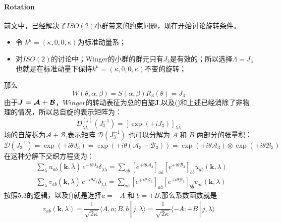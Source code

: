 \paragraph*{Rotation}
前文中，已经解决了$ISO(2)$小群带来的约束问题，现在开始讨论旋转条件。
\begin{itemize}
    \item 令 $k^\mu = (\kappa,0,0,\kappa)$为标准动量系；
    \item 对$ISO(2) $的讨论中；Winger的小群的群元只有$J_3$是有效的；所以选择$\Lambda=J_3$也就是在标准动量下保持$k^\mu = (\kappa,0,0,\kappa)$不变的旋转；
\end{itemize}
那么
\[W(\theta,\alpha,\beta)=S(\alpha,\beta)R_3(\theta)=J_3\]
由于$\boldmath{J}=\boldsymbol{\mathcal{A}}+\boldsymbol{\mathcal{B}}$，$Winger$的转动表征为总的自旋$\boldsymbol{J}$,以及()和上述已经消除了非物理的情况，所以总自旋的表示矩阵为：
\[
D_{\lambda\bar\lambda}^{(j)}(J_3^{-1})=\left[\exp(+iJ_3)\right]_{\lambda\bar\lambda}
\]
场的自旋拆为$\boldsymbol{\mathcal{A}}+\boldsymbol{\mathcal{B}}$,表示矩阵 $\mathscr{D}(J_3^{-1})$ 也可以分解为 $A$ 和 $B$ 两部分的张量积：
\[
\mathscr{D}(J_3^{-1}) = \exp\left( +i \theta J_3 \right) = \exp\left( +i \theta (\mathcal{A}_3 + \mathcal{B}_3) \right) = \exp\left( +i \theta \mathcal{A}_3 \right) \otimes \exp\left( +i \theta \mathcal{B}_3 \right)
\]
在这种分解下交织方程变为：  
\begin{subequations}\label{massless_rotation}
    \begin{align}
        &\sum_{\bar\lambda} u_{ab}(\boldsymbol{k},\bar\lambda)\, e^{-i \theta J_3} \delta_{\lambda\bar\lambda} = \sum_{\bar{a}\bar{b}} \left[ e^{+i \theta \mathcal{A}_3} \right]_{a\bar{a}} \left[ e^{+i \theta \mathcal{B}_3} \right]_{b\bar{b}} u_{\bar{a}\bar{b}}(\boldsymbol{k},\lambda)\\
        &\sum_{\bar\lambda} v_{ab}(\boldsymbol{k},\bar\lambda)\,e^{+i \theta J_3} \delta_{\lambda\bar\lambda} = \sum_{\bar{a}\bar{b}} \left[ e^{+i \theta \mathcal{A}_3} \right]_{a\bar{a}} \left[ e^{+i \theta \mathcal{B}_3} \right]_{b\bar{b}} v_{\bar{a}\bar{b}}(\boldsymbol{k},\lambda)
    \end{align}
\end{subequations}
按照5.3的逻辑，以及()就是选择$a = -A$ 和 $b = +B$,那么系数函数就是
\begin{equation}\label{massless_c}
    v_{ab}(\boldsymbol{k},\lambda) =\frac{1}{\sqrt{2\kappa}} \langle A,a;B,b \,|\, j, \lambda \rangle=\frac{1}{\sqrt{2\kappa}} \langle -A; +B \,|\, j, \lambda \rangle  
\end{equation}
